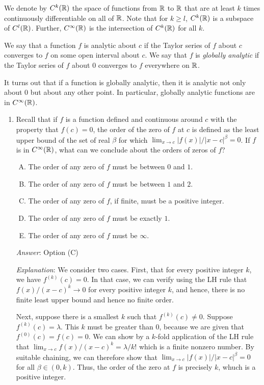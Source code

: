 \documentclass[10pt]{amsart}
\begin{document}
We denote by $C^k(\mathbb{R})$ the space of functions from $\mathbb{R}$ to $\mathbb{R}$ that
are at least $k$ times continuously differentiable on all of
$\mathbb{R}$. Note that for $k \ge l$, $C^k(\mathbb{R})$ is a subspace of
$C^l(\mathbb{R})$. Further, $C^\infty(\mathbb{R})$ is the intersection of $C^k(\mathbb{R})$
for all $k$.

We say that a function $f$ is analytic about $c$ if the Taylor series
of $f$ about $c$ converges to $f$ on some open interval about $c$. We
say that $f$ is {\em globally analytic} if the Taylor series of $f$
about $0$ converges to $f$ everywhere on $\mathbb{R}$.

It turns out that if a function is globally analytic, then it is
analytic not only about $0$ but about any other point. In particular,
globally analytic functions are in $C^\infty(\mathbb{R})$.

\begin{enumerate}
\item Recall that if $f$ is a function defined and continuous around
  $c$ with the property that $f(c) = 0$, the order of the zero of $f$
  at $c$ is defined as the least upper bound of the set of real $\beta$ for
  which $\lim_{x \to c} |f(x)|/|x - c|^\beta = 0$. If $f$ is in
  $C^{\infty}(\mathbb{R})$, what can we conclude about the orders of zeros of
  $f$?

  \begin{enumerate}[(A)]
  \item The order of any zero of $f$ must be between $0$ and $1$.
  \item The order of any zero of $f$ must be between $1$ and $2$.
  \item The order of any zero of $f$, if finite, must be a positive
  integer.
  \item The order of any zero of $f$ must be exactly $1$.
  \item The order of any zero of $f$ must be $\infty$.
  \end{enumerate}

  {\em Answer}: Option (C)

  {\em Explanation}: We consider two cases. First, that for every
  positive integer $k$, we have $f^{(k)}(c) = 0$. In that case, we can
  verify using the LH rule that $f(x)/(x - c)^k \to 0$ for every
  positive integer $k$, and hence, there is no finite least upper
  bound and hence no finite order.

  Next, suppose there is a smallest $k$ such that $f^{(k)}(c) \ne
  0$. Suppose $f^{(k)}(c) = \lambda$. This $k$ must be greater than
  $0$, because we are given that $f^{(0)}(c) = f(c) = 0$. We can show
  by a $k$-fold application of the LH rule that $\lim_{x \to c}
  f(x)/(x - c)^k = \lambda/k!$ which is a finite nonzero number. By
  suitable chaining, we can therefore show that $\lim_{x \to c}
  |f(x)|/|x - c|^\beta = 0$ for all $\beta \in (0,k)$. Thus, the order
  of the zero at $f$ is precisely $k$, whuch is a positive integer.


\end{enumerate}
\end{document}
